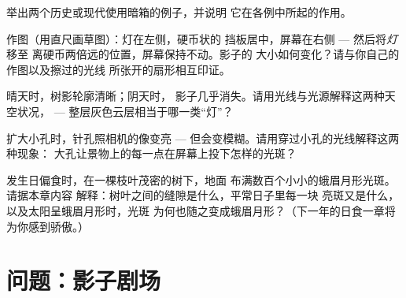 \begin{exercise}[$\star$]\label{exo:g6:light-propagation:8}
举出两个历史或现代使用暗箱的例子，并说明
它在各例中所起的作用。
\end{exercise}

\begin{exercise}[$\star\star$]\label{exo:g6:light-propagation:9}
作图（用直尺画草图）：灯在左侧，硬币状的
挡板居中，屏幕在右侧 --- 然后将\emph{灯}移至
离硬币两倍远的位置，屏幕保持不动。影子的
大小如何变化？请与你自己的作图以及擦过的光线
所张开的扇形相互印证。
\end{exercise}

\begin{exercise}[$\star\star$]\label{exo:g6:light-propagation:10}
晴天时，树影轮廓清晰；阴天时，
影子几乎消失。请用光线与光源解释这两种天空状况，
--- 整层灰色云层相当于哪一类“灯”？
\end{exercise}

\begin{exercise}[$\star\star$]\label{exo:g6:light-propagation:11}
扩大小孔时，针孔照相机的像变亮 ---
但会变模糊。请用穿过小孔的光线解释这两种现象：
大孔让景物上的每一点在屏幕上投下怎样的光斑？
\end{exercise}

\begin{exercise}[$\star\star\star$]\label{exo:g6:light-propagation:12}
发生日偏食时，在一棵枝叶茂密的树下，地面
布满数百个小小的蛾眉月形光斑。请据本章内容
解释：树叶之间的缝隙是什么，平常日子里每一块
亮斑又是什么，以及太阳呈蛾眉月形时，光斑
为何也随之变成蛾眉月形？（下一年的日食一章将
为你感到骄傲。）
\end{exercise}

\section{问题：影子剧场}

